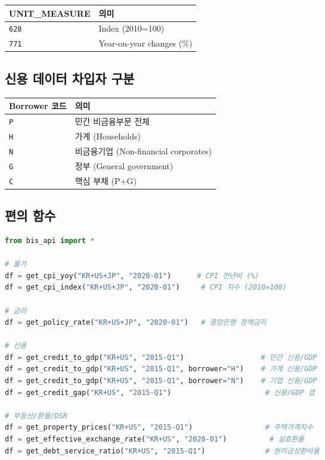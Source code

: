 \documentclass[11pt,a4paper]{article}
\newcommand{\code}[1]{\texttt{#1}}
\begin{document}
\begin{table}[h]
\centering
\begin{tabular}{l l}
\toprule
\textbf{UNIT\_MEASURE} & \textbf{의미} \\
\midrule
\code{628} & Index (2010=100) \\
\code{771} & Year-on-year changes (\%) \\
\bottomrule
\end{tabular}
\end{table}

\subsection{신용 데이터 차입자 구분}

\begin{table}[h]
\centering
\begin{tabular}{l l}
\toprule
\textbf{Borrower 코드} & \textbf{의미} \\
\midrule
\code{P} & 민간 비금융부문 전체 \\
\code{H} & 가계 (Households) \\
\code{N} & 비금융기업 (Non-financial corporates) \\
\code{G} & 정부 (General government) \\
\code{C} & 핵심 부채 (P+G) \\
\bottomrule
\end{tabular}
\end{table}

\subsection{편의 함수}

\begin{lstlisting}[language=Python]
from bis_api import *

# 물가
df = get_cpi_yoy("KR+US+JP", "2020-01")      # CPI 전년비 (%)
df = get_cpi_index("KR+US+JP", "2020-01")     # CPI 지수 (2010=100)

# 금리
df = get_policy_rate("KR+US+JP", "2020-01")   # 중앙은행 정책금리

# 신용
df = get_credit_to_gdp("KR+US", "2015-Q1")                  # 민간 신용/GDP
df = get_credit_to_gdp("KR+US", "2015-Q1", borrower="H")    # 가계 신용/GDP
df = get_credit_to_gdp("KR+US", "2015-Q1", borrower="N")    # 기업 신용/GDP
df = get_credit_gap("KR+US", "2015-Q1")                      # 신용/GDP 갭

# 부동산/환율/DSR
df = get_property_prices("KR+US", "2015-Q1")                 # 주택가격지수
df = get_effective_exchange_rate("KR+US", "2020-01")          # 실효환율
df = get_debt_service_ratio("KR+US", "2015-Q1")              # 원리금상환비율
\end{lstlisting}
\end{document}
